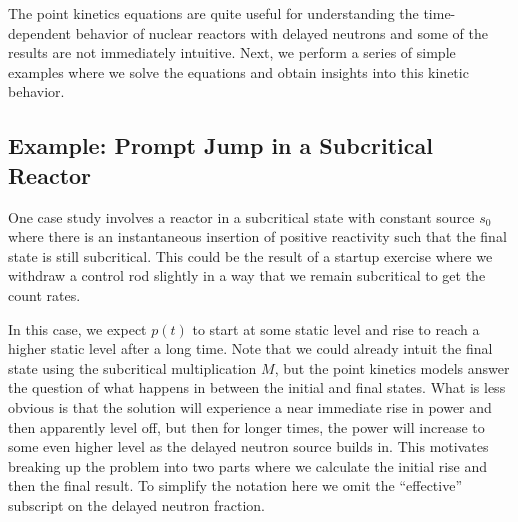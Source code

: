 The point kinetics equations are quite useful for understanding the time-dependent behavior of nuclear reactors with delayed neutrons and some of the results are not immediately intuitive. Next, we perform a series of simple examples where we solve the equations and obtain insights into this kinetic behavior.

\subsection{Example: Prompt Jump in a Subcritical Reactor}

One case study involves a reactor in a subcritical state with constant source $s_0$ where there is an instantaneous insertion of positive reactivity such that the final state is still subcritical. This could be the result of a startup exercise where we withdraw a control rod slightly in a way that we remain subcritical to get the count rates. 

In this case, we expect $p(t)$ to start at some static level and rise to reach a higher static level after a long time. Note that we could already intuit the final state using the subcritical multiplication $M$, but the point kinetics models answer the question of what happens in between the initial and final states. What is less obvious is that the solution will experience a near immediate rise in power and then apparently level off, but then for longer times, the power will increase to some even higher level as the delayed neutron source builds in. This motivates breaking up the problem into two parts where we calculate the initial rise and then the final result. To simplify the notation here we omit the ``effective'' subscript on the delayed neutron fraction.

